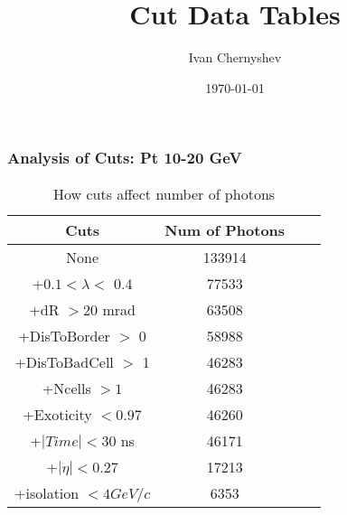 \documentclass{beamer}
\title{Cut Data Tables}
\author{Ivan Chernyshev}
\date{\today}
\begin{document}
 

\frame 
{ 
\frametitle{Analysis of Cuts: Pt 10-20 GeV} 
\begin{table} 
\caption{How cuts affect number of photons} 
\centering 
\begin{tabular}{c c c c} 
\hline\hline 
Cuts & Num of Photons\\ [0.5ex] 
\hline
None & 133914\\
+$0.1 < \lambda <$ 0.4 & 77533\\
+dR $> 20$ mrad & 63508\\
+DisToBorder $>$ 0 & 58988\\
+DisToBadCell $>$ 1 & 46283\\
+Ncells $> 1$ & 46283\\
+Exoticity $< 0.97$ & 46260\\
+$|Time| < 30$ ns & 46171\\
+$|\eta| < 0.27$ & 17213\\
+isolation $< 4 GeV/c$ & 6353\\
[1ex] 
\hline 
\end{tabular} 
\label{table:nonlin} 
\end{table} 
} 
\end{document}
